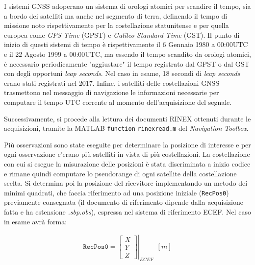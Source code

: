 \documentclass[a4paper,11pt,twoside]{book}
\begin{document}
\begin{itemize}[-]
		
		I sistemi GNSS adoperano un sistema di orologi atomici per scandire il tempo, sia a bordo dei satelliti ma anche nel segmento di terra, definendo il tempo di missione noto rispettivamente per la costellazione statunitense e per quella europea come \textit{GPS Time} (GPST) e \textit{Galileo Standard Time} (GST). Il punto di inizio di questi sistemi di tempo è rispettivamente il 6 Gennaio 1980 a 00:00UTC e il 22 Agosto 1999 a 00:00UTC, ma essendo il tempo scandito da orologi atomici, è necessario periodicamente "aggiustare" il tempo registrato dal GPST o dal GST con degli opportuni \textit{leap seconds}. Nel caso in esame, 18 secondi di \textit{leap seconds} erano stati registrati nel 2017. Infine, i satelliti delle costellazioni GNSS trasmettono nel messaggio di navigazione le informazioni necessarie per computare il tempo UTC corrente al momento dell'acquisizione del segnale.		
	\end{itemize}
	
	Successivamente, si procede alla lettura dei documenti RINEX ottenuti durante le acquisizioni, tramite la MATLAB \texttt{function} \texttt{rinexread.m} del \textit{Navigation Toolbox}. 
	
	Più osservazioni sono state eseguite per determinare la posizione di interesse e per ogni osservazione c'erano più satelliti in vista di più costellazioni. La costellazione con cui si esegue la misurazione delle posizioni è stata discriminata a inizio codice e rimane quindi computare lo pseudorange di ogni satellite della costellazione scelta. Si determina poi la posizione del ricevitore implementando un metodo dei minimi quadrati, che faccia riferimento ad una posizione iniziale (\texttt{RecPos0}) previamente consegnata (il documento di riferimento dipende dalla acquisizione fatta e ha estensione \textsl{.sbp.obs}), espressa nel sistema di riferimento ECEF. Nel caso in esame avrà forma:
	
	\begin{equation}
		\begin{aligned}
			\texttt{RecPos0} = \left.  \begin{bmatrix}
				X \\
				Y \\
				Z
			\end{bmatrix} \right|_{ECEF} \ \ [m]
		\end{aligned}
	\end{equation}
	
\end{document}
